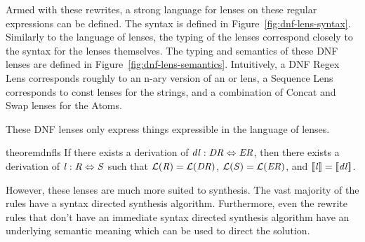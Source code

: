 Armed with these rewrites, a strong language for lenses on these regular
expressions can be defined.
The syntax is defined in Figure~\ref{fig:dnf-lens-syntax}.
Similarly to the language of lenses, the typing of the lenses
correspond closely to the syntax for the lenses themselves.
The typing and semantics of these DNF lenses are defined in Figure~\ref{fig:dnf-lens-semantics}.
Intuitively, a DNF Regex Lens corresponds roughly to an n-ary version of an or lens,
a Sequence Lens corresponds to const lenses for the strings, and a combination of
Concat and Swap lenses for the Atoms.

These DNF lenses only express things expressible in the language of lenses.
\begin{restatable}{theorem}{dnfls}
\label{thm:dnfls}
If there exists a derivation of $\mathit{dl} : \mathit{DR} \Leftrightarrow \mathit{ER}$,
then there exists a derivation of $\mathit{l} : \mathit{R} \Leftrightarrow \mathit{S}$ such that
$\mathcal{L}(\mathit{R})=\mathcal{L}(\mathit{DR})$,
$\mathcal{L}(\mathit{S})=\mathcal{L}(\mathit{ER})$, and
$[ \! [\mathit{l}] \! ]=[ \! [\mathit{dl}] \! ]$.
\end{restatable}

However, these lenses are much more suited to synthesis.
The vast majority of the rules have a syntax directed synthesis algorithm.
Furthermore, even the rewrite rules that don't have an immediate syntax directed
synthesis algorithm have an underlying semantic meaning which can be used
to direct the solution.
